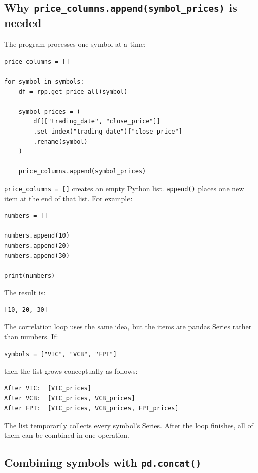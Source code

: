 \documentclass[11pt,a4paper]{article}
\begin{document}
\subsection{Why \texttt{price\_columns.append(symbol\_prices)} is needed}

The program processes one symbol at a time:

\begin{lstlisting}[style=python]
price_columns = []

for symbol in symbols:
    df = rpp.get_price_all(symbol)

    symbol_prices = (
        df[["trading_date", "close_price"]]
        .set_index("trading_date")["close_price"]
        .rename(symbol)
    )

    price_columns.append(symbol_prices)
\end{lstlisting}

\texttt{price\_columns = []} creates an empty Python list.
\texttt{append()} places one new item at the end of that list. For example:

\begin{lstlisting}[style=python]
numbers = []

numbers.append(10)
numbers.append(20)
numbers.append(30)

print(numbers)
\end{lstlisting}

The result is:

\begin{lstlisting}[style=terminal]
[10, 20, 30]
\end{lstlisting}

The correlation loop uses the same idea, but the items are pandas Series
rather than numbers. If:

\begin{lstlisting}[style=python]
symbols = ["VIC", "VCB", "FPT"]
\end{lstlisting}

then the list grows conceptually as follows:

\begin{lstlisting}[style=terminal]
After VIC:  [VIC_prices]
After VCB:  [VIC_prices, VCB_prices]
After FPT:  [VIC_prices, VCB_prices, FPT_prices]
\end{lstlisting}

The list temporarily collects every symbol's Series. After the loop finishes,
all of them can be combined in one operation.

\subsection{Combining symbols with \texttt{pd.concat()}}
\end{document}
